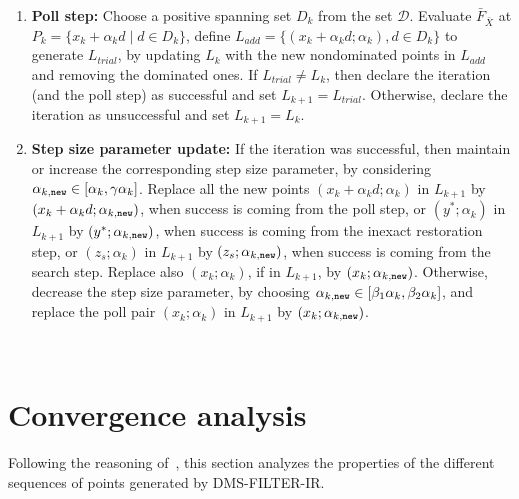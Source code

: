 \documentclass[12pt]{article}
\begin{document}
\begin{algorithm}
\begin{rm}
\begin{description}
{\begin{enumerate}
\item[4.] {\bf Poll step:} Choose a positive spanning set $D_k$
from the set $\mathcal{D}$. Evaluate $\bar{F}_{\bar{X}}$ at
$P_k=\{x_k+\alpha_k d\mid d\in D_k\}$, define
$L_{add}=\{(x_k+\alpha_k d;\alpha_k), d\in D_k \}$ to generate
$L_{trial}$, by updating $L_k$ with the new nondominated points in
$L_{add}$ and removing the dominated ones. If $L_{trial} \neq
L_k$, then declare the iteration (and the poll step) as successful
and set $L_{k+1}=L_{trial}$. Otherwise, declare the iteration as
unsuccessful and set $L_{k+1}=L_k$.\ \\

\item[5.] {\bf Step size parameter update:} If the iteration was
successful, then maintain or increase the corresponding step size
parameter, by considering $\alpha_{k,{\tt new}}\in
[\alpha_k,\gamma\alpha_k]$. Replace all the new points $(x_k
+\alpha_k d; \alpha_k)$ in $L_{k+1}$ by $(x_k+ \alpha_k d;
\alpha_{k,{\tt new}})$, when success is coming from the poll step,
or $(y^*;\alpha_k)$ in $L_{k+1}$ by $(y^*;\alpha_{k,{\tt new}})$,
when success is coming from the inexact restoration step, or
$(z_s;\alpha_k)$ in $L_{k+1}$ by $(z_s;\alpha_{k,{\tt new}})$,
when success is coming from the search step. Replace also
$(x_k;\alpha_k)$, if in $L_{k+1}$, by $(x_k;\alpha_{k,{\tt
new}})$. Otherwise, decrease the step size parameter, by choosing
$\alpha_{k,{\tt new}}\in [\beta_1\alpha_k,\beta_2\alpha_k]$, and
replace the poll pair $(x_k;\alpha_k)$ in $L_{k+1}$ by
$(x_k;\alpha_{k,{\tt new}})$. \vspace{1ex}
\end{enumerate}
\item[EndFor]\ \\}
\end{description}
\end{rm}
\label{DMS-FILTER-IR} \caption{DMS-FILTER-IR method for
constrained MOO}
\end{algorithm}


\section{Convergence analysis}
\label{sec:convergence} Following the reasoning
of~\cite{audet2004,custodio2011}, this section analyzes the
properties of the different sequences of points generated by
DMS-FILTER-IR.
\end{document}
